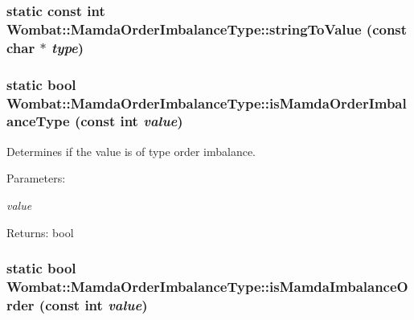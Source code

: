 \hypertarget{classWombat_1_1MamdaOrderImbalanceType_663f7a8d8da8fda23d711502b2da1762}{
\subsubsection[stringToValue]{\setlength{\rightskip}{0pt plus 5cm}static const int Wombat::Mamda\-Order\-Imbalance\-Type::string\-To\-Value (const char $\ast$ {\em type})}}
\label{classWombat_1_1MamdaOrderImbalanceType_663f7a8d8da8fda23d711502b2da1762}


\hypertarget{classWombat_1_1MamdaOrderImbalanceType_424a164dcbeff0839f0a0349171e0a51}{
\subsubsection[isMamdaOrderImbalanceType]{\setlength{\rightskip}{0pt plus 5cm}static bool Wombat::Mamda\-Order\-Imbalance\-Type::is\-Mamda\-Order\-Imbalance\-Type (const int {\em value})}}
\label{classWombat_1_1MamdaOrderImbalanceType_424a164dcbeff0839f0a0349171e0a51}


Determines if the value is of type order imbalance. 

\begin{Desc}
\item[Parameters:]
\begin{description}
\item[{\em value}]\end{description}
\end{Desc}
\begin{Desc}
\item[Returns:]bool \end{Desc}
\hypertarget{classWombat_1_1MamdaOrderImbalanceType_ead12fbb3cb238a2e77cb7431109f42d}{
\subsubsection[isMamdaImbalanceOrder]{\setlength{\rightskip}{0pt plus 5cm}static bool Wombat::Mamda\-Order\-Imbalance\-Type::is\-Mamda\-Imbalance\-Order (const int {\em value})}}
\label{classWombat_1_1MamdaOrderImbalanceType_ead12fbb3cb238a2e77cb7431109f42d}


